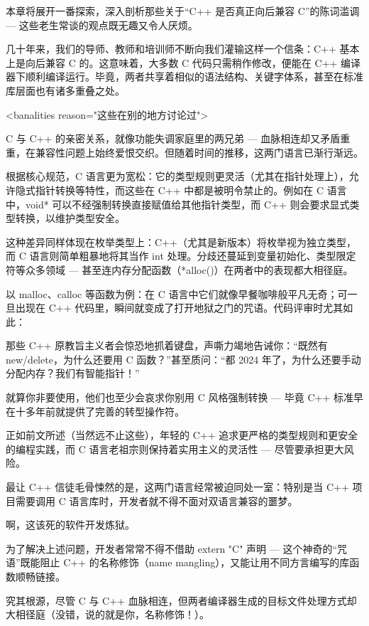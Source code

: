 
本章将展开一番探索，深入剖析那些关于“C++ 是否真正向后兼容 C”的陈词滥调 --- 这些老生常谈的观点既无趣又令人厌烦。

几十年来，我们的导师、教师和培训师不断向我们灌输这样一个信条：C++ 基本上是向后兼容 C 的。这意味着，大多数 C 代码只需稍作修改，便能在 C++ 编译器下顺利编译运行。毕竟，两者共享着相似的语法结构、关键字体系，甚至在标准库层面也有诸多重叠之处。

\begin{shell}
<banalities reason="这些在别的地方讨论过">
\end{shell}

C 与 C++ 的亲密关系，就像功能失调家庭里的两兄弟 --- 血脉相连却又矛盾重重，在兼容性问题上始终爱恨交织。但随着时间的推移，这两门语言已渐行渐远。

根据核心规范，C 语言更为宽松：它的类型规则更灵活（尤其在指针处理上），允许隐式指针转换等特性，而这些在 C++ 中都是被明令禁止的。例如在 C 语言中，void* 可以不经强制转换直接赋值给其他指针类型，而 C++ 则会要求显式类型转换，以维护类型安全。

这种差异同样体现在枚举类型上：C++（尤其是新版本）将枚举视为独立类型，而 C 语言则简单粗暴地将其当作 int 处理。分歧还蔓延到变量初始化、类型限定符等众多领域 --- 甚至连内存分配函数（*alloc()）在两者中的表现都大相径庭。

以 malloc、calloc 等函数为例：在 C 语言中它们就像早餐咖啡般平凡无奇；可一旦出现在 C++ 代码里，瞬间就变成了打开地狱之门的咒语。代码评审时尤其如此：

那些 C++ 原教旨主义者会惊恐地抓着键盘，声嘶力竭地告诫你：“既然有 new/delete，为什么还要用 C 函数？”甚至质问：“都 2024 年了，为什么还要手动分配内存？我们有智能指针！”

就算你非要使用，他们也至少会哀求你别用 C 风格强制转换 --- 毕竟 C++ 标准早在十多年前就提供了完善的转型操作符。

正如前文所述（当然远不止这些），年轻的 C++ 追求更严格的类型规则和更安全的编程实践，而 C 语言老祖宗则保持着实用主义的灵活性 --- 尽管要承担更大风险。

最让 C++ 信徒毛骨悚然的是，这两门语言经常被迫同处一室：特别是当 C++ 项目需要调用 C 语言库时，开发者就不得不面对双语言兼容的噩梦。

啊，这该死的软件开发炼狱。

为了解决上述问题，开发者常常不得不借助 extern "C" 声明 --- 这个神奇的“咒语”既能阻止 C++ 的名称修饰（name mangling），又能让用不同方言编写的库函数顺畅链接。

究其根源，尽管 C 与 C++ 血脉相连，但两者编译器生成的目标文件处理方式却大相径庭（没错，说的就是你，名称修饰！）。

